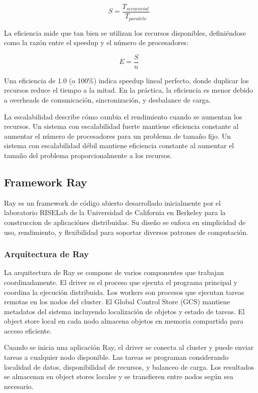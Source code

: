 \documentclass[12pt,a4paper,twoside]{book}
\begin{document}
\begin{equation}
S = \frac{T_{secuencial}}{T_{paralelo}}
\end{equation}

La eficiencia mide que tan bien se utilizan los recursos disponibles, definiéndose como la razón entre el speedup y el número de procesadores:

\begin{equation}
E = \frac{S}{n}
\end{equation}

Una eficiencia de 1.0 (o 100\%) indica speedup lineal perfecto, donde duplicar los recursos reduce el tiempo a la mitad. En la práctica, la eficiencia es menor debido a overheads de comunicación, sincronización, y desbalance de carga.

La escalabilidad describe cómo cambia el rendimiento cuando se aumentan los recursos. Un sistema con escalabilidad fuerte mantiene eficiencia constante al aumentar el número de procesadores para un problema de tamaño fijo. Un sistema con escalabilidad débil mantiene eficiencia constante al aumentar el tamaño del problema proporcionalmente a los recursos.

\subsection{Framework Ray}

Ray es un framework de código abierto desarrollado inicialmente por el laboratorio RISELab de la Universidad de California en Berkeley para la construccion de aplicaciónes distribuidas. Su diseño se enfoca en simplicidad de uso, rendimiento, y flexibilidad para soportar diversos patrones de computación.

\subsubsection{Arquitectura de Ray}

La arquitectura de Ray se compone de varios componentes que trabajan coordinadamente. El driver es el proceso que ejecuta el programa principal y coordina la ejecución distribuida. Los workers son procesos que ejecutan tareas remotas en los nodos del cluster. El Global Control Store (GCS) mantiene metadatos del sistema incluyendo localización de objetos y estado de tareas. El object store local en cada nodo almacena objetos en memoria compartida para acceso eficiente.

Cuando se inicia una aplicación Ray, el driver se conecta al cluster y puede enviar tareas a cualquier nodo disponible. Las tareas se programan considerando localidad de datos, disponibilidad de recursos, y balanceo de carga. Los resultados se almacenan en object stores locales y se transfieren entre nodos según sea necesario.
\end{document}
